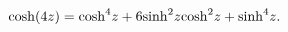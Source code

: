 \[\mathop{\cosh\/}\nolimits\!\left(4z\right)={\mathop{\cosh\/}\nolimits^{4}}z+6{%
\mathop{\sinh\/}\nolimits^{2}}z{\mathop{\cosh\/}\nolimits^{2}}z+{\mathop{\sinh%
\/}\nolimits^{4}}z.\]